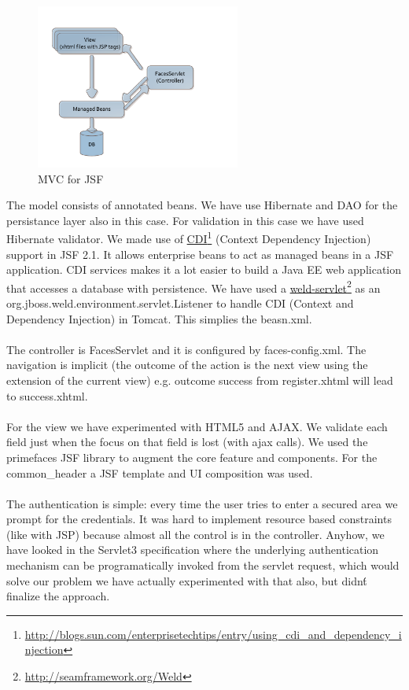 \begin{figure}[H]
    \begin{center}
        \includegraphics[width=0.6\textwidth]{fig/MVC_JSF.pdf}
        \caption{MVC for JSF}
        \label{fig.MVC_jsf}
    \end{center}
\end{figure}

The model consists of annotated beans. We have use Hibernate and DAO for the
persistance layer also in this case. For validation in this case we have used
Hibernate validator. We made use of
\href{http://blogs.sun.com/enterprisetechtips/entry/using_cdi_and_dependency_injection}{CDI}\footnote{\url{http://blogs.sun.com/enterprisetechtips/entry/using_cdi_and_dependency_injection}}
(Context Dependency Injection) support in JSF 2.1. It allows enterprise beans to act as managed beans in a JSF application. CDI services makes it a lot easier to build a Java EE web application 
that accesses a database with persistence. We have used a
\href{http://seamframework.org/Weld}{weld-servlet}\footnote{\url{http://seamframework.org/Weld}}
as an org.jboss.weld.environment.servlet.Listener to handle CDI (Context and
Dependency Injection) in Tomcat. This simplies the beasn.xml.
\\\\
The controller is FacesServlet and it is configured by faces-config.xml.
The navigation is implicit (the outcome of the action is the next view using the
extension of the current view) e.g. outcome success from register.xhtml will
lead to success.xhtml.
\\\\
For the view we have experimented with HTML5 and AJAX. We validate each field
just when the focus on that field is lost (with ajax calls). We used the
primefaces JSF library to augment the core feature and components. For the
common\_header a JSF template and UI composition was used.
\\\\
The authentication is simple: every time the user tries to enter a secured area
we prompt for the credentials. It was hard to implement resource based constraints 
(like with JSP) because almost all the control is in the controller. Anyhow, we
have looked in the Servlet3 specification where the underlying authentication 
mechanism can be programatically invoked from the servlet request, which would solve our problem
we have actually experimented with that also, but didn\'t finalize the approach.

